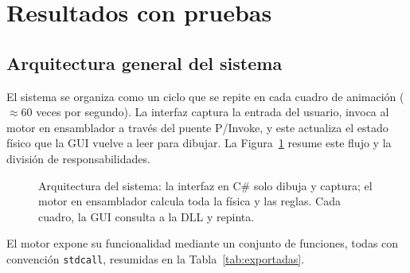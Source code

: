 \documentclass[a4paper,12pt]{article}
\begin{document}
\newpage
\section{Resultados con pruebas}
\subsection{Arquitectura general del sistema}
El sistema se organiza como un ciclo que se repite en cada cuadro de animación (\(\approx\)60 veces por segundo). La interfaz captura la entrada del usuario, invoca al motor en ensamblador a través del puente P/Invoke, y este actualiza el estado físico que la GUI vuelve a leer para dibujar. La Figura~\ref{fig:arquitectura} resume este flujo y la división de responsabilidades.

\begin{figure}[H]
\centering
{}
\caption{Arquitectura del sistema: la interfaz en C\# solo dibuja y captura; el motor en ensamblador calcula toda la física y las reglas. Cada cuadro, la GUI consulta a la DLL y repinta.}
\label{fig:arquitectura}
\end{figure}

El motor expone su funcionalidad mediante un conjunto de funciones, todas con convención \texttt{stdcall}, resumidas en la Tabla~\ref{tab:exportadas}.
\end{document}
